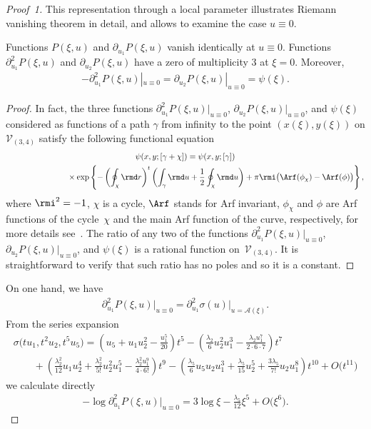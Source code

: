 \begin{proof}[Proof~1]
This representation through a local parameter illustrates Riemann vanishing theorem in detail, and allows to examine the case $u\equiv 0$.
\begin{Lemma}\label{L:PsiC34}
Functions $P(\xi,u)$ and $\partial_{u_1} P(\xi,u)$ vanish identically at $u\equiv 0$. Functions $\partial^2_{u_1} P(\xi,u)$ and $\partial_{u_2} P(\xi,u)$ have a zero of multiplicity $3$ at $\xi=0$. Moreover,
\begin{gather*}
 -\partial^2_{u_1} P(\xi,u)|_{u\equiv 0} = \partial_{u_2} P(\xi,u)|_{u\equiv 0} = \psi(\xi).
\end{gather*}
\end{Lemma}
\begin{proof} In fact, the three functions $\partial^2_{u_1} P(\xi,u)|_{u\equiv 0}$, $\partial_{u_2} P(\xi,u)|_{u\equiv 0}$, and $\psi(\xi)$ considered as functions of a path $\gamma$ from infinity to the point $(x(\xi),y(\xi))$ on $\mathcal{V}_{(3,4)}$ satisfy the following functional equation
\begin{gather}
 \psi(x,y;[\gamma + \chi]) = \psi(x,y;[\gamma]) \nonumber\\
 \hphantom{\psi(x,y;[\gamma + \chi]) =}{}\times \exp \left\{ - \left(\oint_{\chi} \rmd r \right)^t
 \left(\int_{\gamma} \rmd u + \frac{1}{2}\oint_{\chi} \rmd u\right) + \pi \rmi \big(\Arf(\phi_\chi) - \Arf(\phi) \big)\right\},\label{PsiFEq}
\end{gather}
where $\rmi^2=-1$, $\chi$ is a cycle, $\Arf$ stands for Arf invariant, $\phi_\chi$ and $\phi$ are Arf functions of the cycle~$\chi$ and the main Arf function of the curve, respectively, for more details see~\cite{BL2005}. The ratio of any two of the functions $\partial^2_{u_1} P(\xi,u)|_{u\equiv 0}$, $\partial_{u_2} P(\xi,u)|_{u\equiv 0}$, and $\psi(\xi)$ is a rational function on~$\mathcal{V}_{(3,4)}$. It is straightforward to verify that such ratio has no poles and so it is a constant.
\end{proof}

On one hand, we have
\begin{gather*}
 \partial^2_{u_1} P(\xi,u) \big|_{u\equiv 0} = \partial^2_{u_1} \sigma (u) \big|_{u = \mathcal{A}(\xi)}.
\end{gather*}
From the series expansion
\begin{gather}
 \sigma\big(t u_1,t^2 u_2,t^5 u_5\big) = \left(u_5 + u_1 u_2^2 - \frac{u_1^5}{20} \right)t^5 -
 \left(\frac{\lambda_2}{6} u_2^2 u_1^3 - \frac{\lambda_2 u_1^7}{2\cdot 6\cdot 7}\right)t^7 \label{C34Sigma}\\
 \qquad{} + \left(\frac{\lambda_2^2}{12} u_1 u_2^4 + \frac{\lambda_2^2}{5!} u_2^2 u_1^5
 - \frac{\lambda_2^2 u_1^9}{4\cdot 6!} \right) t^9
 - \left(\frac{\lambda_5}{6} u_5 u_2 u_1^3 + \frac{\lambda_5}{15} u_2^5 +
 \frac{3\lambda_5}{7!}u_2 u_1^8 \right)t^{10} + O\big(t^{11}\big)\nonumber
\end{gather}
we calculate directly
\begin{gather}\label{C34Psisigma}
 -\log \partial^2_{u_1} P(\xi,u) \big|_{u\equiv 0} = 3\log \xi - \frac{\lambda_5}{12} \xi^5 + O\big(\xi^6\big).
\end{gather}


\end{proof}
